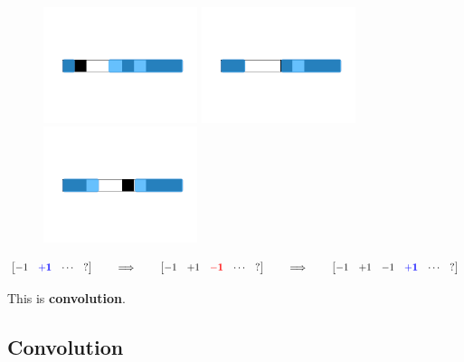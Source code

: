         \begin{figure}[H]
            \includegraphics[width=45mm,scale=0.5]{images/convolutional_neural_networks_images/1d_window2.png}
            \includegraphics[width=45mm,scale=0.5]{images/convolutional_neural_networks_images/1d_window3.png}
            \includegraphics[width=45mm,scale=0.5]{images/convolutional_neural_networks_images/1d_window4.png}
        \end{figure}

        \begin{equation*}
            \begin{bmatrix}
                -1 & \mathbf{\textcolor{blue}{+1}} & \cdots & ?
            \end{bmatrix}
            \qquad\implies\qquad
            \begin{bmatrix}
                -1 & +1 & \mathbf{\textcolor{red}{-1}} & \cdots & ?
            \end{bmatrix}
            \qquad\implies\qquad
            \begin{bmatrix}
                -1 & +1 & -1 &\mathbf{\textcolor{blue}{+1}} & \cdots & ?
            \end{bmatrix}
        \end{equation*}

        This is \textbf{convolution}.

    \pagebreak

    \subsection{Convolution}
    
